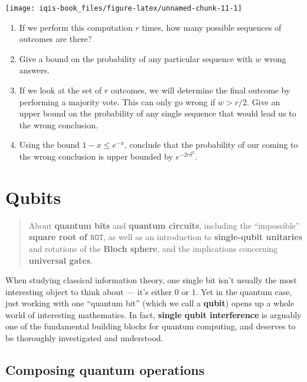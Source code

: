 \documentclass[fleqn]{article}
\providecommand{\tightlist}{%
  \setlength{\itemsep}{0pt}\setlength{\parskip}{0pt}}
\let\oldsection\section
\renewcommand\section{\clearpage\oldsection}
\begin{document}
\begin{center}\texttt{[image: iqis-book\_files/figure-latex/unnamed-chunk-11-1]} \end{center}

\begin{enumerate}
\def\labelenumi{\arabic{enumi}.}
\tightlist
\item
  If we perform this computation \(r\) times, how many possible sequences of outcomes are there?
\item
  Give a bound on the probability of any particular sequence with \(w\) wrong answers.
\item
  If we look at the set of \(r\) outcomes, we will determine the final outcome by performing a majority vote.
  This can only go wrong if \(w>r/2\).
  Give an upper bound on the probability of any single sequence that would lead us to the wrong conclusion.
\item
  Using the bound \(1-x\leqslant e^{-x}\), conclude that the probability of our coming to the wrong conclusion is upper bounded by \(e^{-2r\delta^2}\).
\end{enumerate}

\hypertarget{chapter2}{%
\section{Qubits}\label{chapter2}}

\begin{quote}
About \textbf{quantum bits} and \textbf{quantum circuits}, including the ``impossible'' \textbf{square root of \(\texttt{NOT}\)}, as well as an introduction to \textbf{single-qubit unitaries} and rotations of the \textbf{Bloch sphere}, and the implications concerning \textbf{universal gates}.
\end{quote}

When studying classical information theory, one single bit isn't usually the most interesting object to think about --- it's either \(0\) or \(1\).
Yet in the quantum case, just working with one ``quantum bit'' (which we call a \textbf{qubit}) opens up a whole world of interesting mathematics.
In fact, \textbf{single qubit interference} is arguably one of the fundamental building blocks for quantum computing, and deserves to be thoroughly investigated and understood.

\hypertarget{composing-quantum-operations}{%
\subsection{Composing quantum operations}\label{composing-quantum-operations}}
\end{document}
